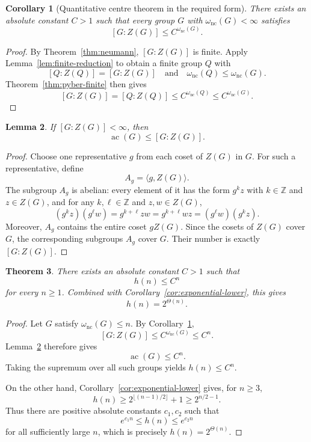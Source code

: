 \documentclass[11pt]{article}
\newtheorem{theorem}{Theorem}[section]
\newtheorem{lemma}[theorem]{Lemma}
\newtheorem{corollary}[theorem]{Corollary}
\theoremstyle{definition}
\newcommand{\Z}{\mathbb{Z}}
\newcommand{\nc}{\omega_{\mathrm{nc}}}
\newcommand{\ac}{\operatorname{ac}}
\begin{document}
\begin{corollary}[Quantitative centre theorem in the required form]
\label{cor:neumann-pyber}
There exists an absolute constant $C>1$ such that every group $G$ with
$\nc(G)<\infty$ satisfies
\[
 [G:Z(G)]\le C^{\nc(G)}.
\]
\end{corollary}

\begin{proof}
By Theorem~\ref{thm:neumann}, $[G:Z(G)]$ is finite.  Apply
Lemma~\ref{lem:finite-reduction} to obtain a finite group $Q$ with
\[
 [Q:Z(Q)]=[G:Z(G)]
 \quad\text{and}\quad
 \nc(Q)\le\nc(G).
\]
Theorem~\ref{thm:pyber-finite} then gives
\[
 [G:Z(G)]
 =[Q:Z(Q)]
 \le C^{\nc(Q)}
 \le C^{\nc(G)}.
\]
\end{proof}

\begin{lemma}\label{lem:center-coset-cover}
If $[G:Z(G)]<\infty$, then
\[
 \ac(G)\le [G:Z(G)].
\]
\end{lemma}

\begin{proof}
Choose one representative $g$ from each coset of $Z(G)$ in $G$.  For such a
representative, define
\[
 A_g=\langle g,Z(G)\rangle.
\]
The subgroup $A_g$ is abelian: every element of it has the form $g^kz$ with
$k\in\Z$ and $z\in Z(G)$, and for any $k,\ell\in\Z$ and $z,w\in Z(G)$,
\[
 (g^kz)(g^\ell w)=g^{k+\ell}zw=g^{k+\ell}wz=(g^\ell w)(g^kz).
\]
Moreover, $A_g$ contains the entire coset $gZ(G)$.  Since the cosets of
$Z(G)$ cover $G$, the corresponding subgroups $A_g$ cover $G$.  Their number
is exactly $[G:Z(G)]$.
\end{proof}

\begin{theorem}\label{thm:exponential-order}
There exists an absolute constant $C>1$ such that
\[
 h(n)\le C^n
\]
for every $n\ge1$.  Combined with
Corollary~\ref{cor:exponential-lower}, this gives
\[
 h(n)=2^{\Theta(n)}.
\]
\end{theorem}

\begin{proof}
Let $G$ satisfy $\nc(G)\le n$.  By
Corollary~\ref{cor:neumann-pyber},
\[
 [G:Z(G)]\le C^{\nc(G)}\le C^n.
\]
Lemma~\ref{lem:center-coset-cover} therefore gives
\[
 \ac(G)\le C^n.
\]
Taking the supremum over all such groups yields $h(n)\le C^n$.

On the other hand, Corollary~\ref{cor:exponential-lower} gives, for $n\ge3$,
\[
 h(n)\ge2^{\lfloor(n-1)/2\rfloor}+1\ge2^{n/2-1}.
\]
Thus there are positive absolute constants $c_1,c_2$ such that
\[
 e^{c_1n}\le h(n)\le e^{c_2n}
\]
for all sufficiently large $n$, which is precisely $h(n)=2^{\Theta(n)}$.
\end{proof}
\end{document}
